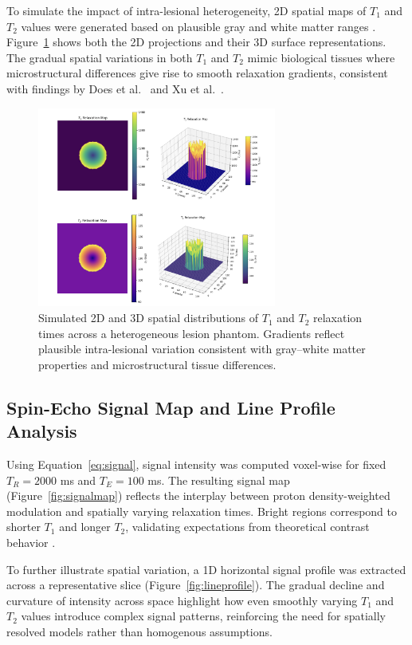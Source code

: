 \documentclass[10pt,a4paper,twoside]{article}
\begin{document}
To simulate the impact of intra-lesional heterogeneity, 2D spatial maps of $ T_1 $ and $ T_2 $ values were generated based on plausible gray and white matter ranges \cite{stanisz2005, bojorquez2017}. Figure~\ref{fig:t1t2maps} shows both the 2D projections and their 3D surface representations. The gradual spatial variations in both $ T_1 $ and $ T_2 $ mimic biological tissues where microstructural differences give rise to smooth relaxation gradients, consistent with findings by Does et al.\ \cite{does2002} and Xu et al.\ \cite{xu2009}.

\begin{figure}[htbp!]
\centering
\includegraphics[width=0.7\textwidth]{figures/t1t2maps.png}
\caption{Simulated 2D and 3D spatial distributions of $T_1$ and $T_2$ relaxation times across a heterogeneous lesion phantom. Gradients reflect plausible intra-lesional variation consistent with gray–white matter properties and microstructural tissue differences.}
\label{fig:t1t2maps}
\end{figure}


\subsection{Spin-Echo Signal Map and Line Profile Analysis}

Using Equation~\eqref{eq:signal}, signal intensity was computed voxel-wise for fixed $ T_R = 2000 $ ms and $ T_E = 100 $ ms. The resulting signal map (Figure~\ref{fig:signalmap}) reflects the interplay between proton density-weighted modulation and spatially varying relaxation times. Bright regions correspond to shorter $ T_1 $ and longer $ T_2 $, validating expectations from theoretical contrast behavior \cite{bernstein2004, brown2014}.

To further illustrate spatial variation, a 1D horizontal signal profile was extracted across a representative slice (Figure~\ref{fig:lineprofile}). The gradual decline and curvature of intensity across space highlight how even smoothly varying $ T_1 $ and $ T_2 $ values introduce complex signal patterns, reinforcing the need for spatially resolved models rather than homogenous assumptions.
\end{document}
